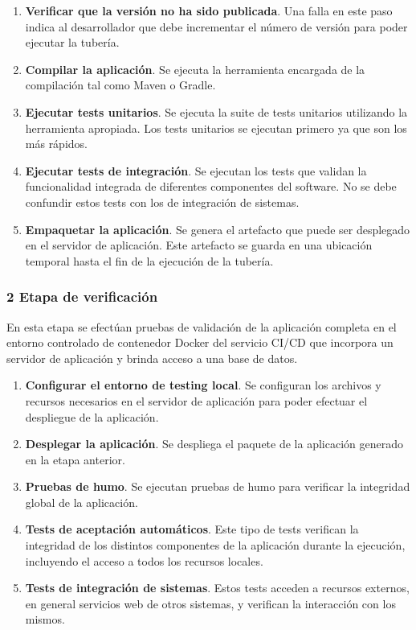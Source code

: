 \begin{enumerate}
\item \textbf{Verificar que la versión no ha sido publicada}. Una
  falla en este paso indica al desarrollador que debe incrementar el
  número de versión para poder ejecutar la tubería.
\item \textbf{Compilar la aplicación}. Se ejecuta la herramienta
  encargada de la compilación tal como Maven o Gradle.
\item \textbf{Ejecutar tests unitarios}. Se ejecuta la suite de tests
  unitarios utilizando la herramienta apropiada. Los tests unitarios
  se ejecutan primero ya que son los más rápidos.
\item \textbf{Ejecutar tests de integración}. Se ejecutan los tests
  que validan la funcionalidad integrada de diferentes componentes del
  software. No se debe confundir estos tests con los de integración de
  sistemas.
\item \textbf{Empaquetar la aplicación}. Se genera el artefacto que
  puede ser desplegado en el servidor de aplicación. Este artefacto se
  guarda en una ubicación temporal hasta el fin de la ejecución de la
  tubería.
\end{enumerate}
\subsubsection{2 Etapa de verificación}

En esta etapa se efectúan pruebas de validación de la aplicación
completa en el entorno controlado de contenedor Docker del servicio
CI/CD que incorpora un servidor de aplicación y brinda acceso a una
base de datos.

\begin{enumerate}
\item \textbf{Configurar el entorno de testing local}. Se configuran
  los archivos y recursos necesarios en el servidor de aplicación para
  poder efectuar el despliegue de la aplicación.
\item \textbf{Desplegar la aplicación}. Se despliega el paquete de la
  aplicación generado en la etapa anterior.
\item \textbf{Pruebas de humo}. Se ejecutan pruebas de humo para
  verificar la integridad global de la aplicación.
\item \textbf{Tests de aceptación automáticos}. Este tipo de tests
  verifican la integridad de los distintos componentes de la
  aplicación durante la ejecución, incluyendo el acceso a todos los
  recursos locales.
\item \textbf{Tests de integración de sistemas}. Estos tests acceden a
  recursos externos, en general servicios web de otros sistemas, y
  verifican la interacción con los mismos.
\end{enumerate}
